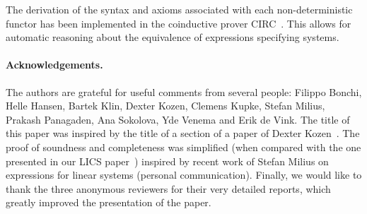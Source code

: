 \documentclass{LMCS}
\theoremstyle{definition}
\theoremstyle{plain}
\theoremstyle{plain}
\theoremstyle{plain}
\theoremstyle{plain}
\theoremstyle{definition}
\theoremstyle{definition}
\begin{document}
The derivation of the syntax and axioms associated with each non-deterministic functor has been implemented in the coinductive prover CIRC~\cite{circ}. This allows for automatic reasoning about the equivalence of expressions specifying  systems. 

\paragraph{\textbf{Acknowledgements.}} The authors are grateful for useful
comments from several people: Filippo Bonchi, Helle Hansen, Bartek
Klin, Dexter Kozen, Clemens Kupke, Stefan Milius, Prakash Panagaden,
Ana Sokolova, Yde Venema and Erik de Vink.  The title of this paper
was inspired by the title of a section of a paper of Dexter
Kozen~\cite{kozen08}. The proof of soundness and completeness was
simplified (when compared with the one presented in our LICS
paper~\cite{BRS09b}) inspired by recent work of Stefan Milius on
expressions for linear systems (personal communication). Finally, we
would like to thank the three anonymous reviewers for their very detailed
reports, which greatly improved the presentation of the paper.\vspace{-24 pt}



\vspace{-20 pt}
\end{document}
